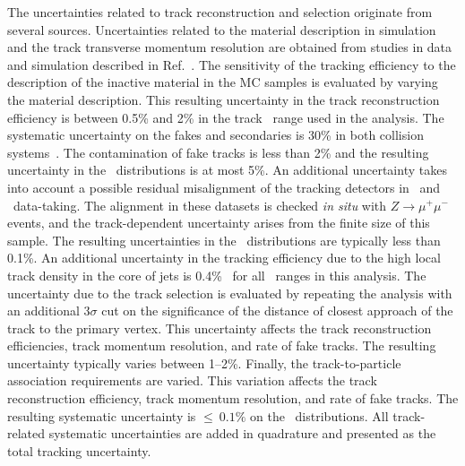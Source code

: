 The uncertainties related to track reconstruction and selection originate from several sources.
Uncertainties related to the material description in simulation and the track transverse 
momentum resolution are obtained from studies in data and simulation described in Ref.~\cite{ATL-PHYS-PUB-2015-051}.
The sensitivity of the tracking efficiency to the description of the 
inactive material in the MC samples is evaluated by varying the material description.
This resulting uncertainty in the track reconstruction efficiency is between
0.5\% and 2\% in the track \pT\ range used in the analysis. 
The systematic uncertainty on the fakes and secondaries is 30\% in both collision systems~\cite{ATL-PHYS-PUB-2015-051}.  The contamination of fake tracks is less than 2\% and the resulting uncertainty in the \Dptr\ distributions is at most 5\%.
An additional uncertainty takes into account a possible residual misalignment of the tracking detectors
in \pp\ and \PbPb\ data-taking. The alignment in these datasets is checked \textit{in situ} with $Z\rightarrow \mu^{+}\mu^{-}$ events, and the track-\pT\-dependent uncertainty arises from the finite size of this sample. The resulting uncertainties in
the \Dptr\ distributions are typically less than 0.1\%. An additional  uncertainty in the tracking efficiency due to the high local track density in the core of jets is 0.4\%~\cite{ATL-PHYS-PUB-2016-007} for all \ptjet\ ranges in this analysis. The uncertainty due to the track selection is evaluated by repeating the analysis with an additional $3\sigma$ cut on the significance of the distance of closest approach of the track to the primary vertex. This uncertainty affects 
the track reconstruction efficiencies, track momentum resolution, and rate of fake tracks. The resulting uncertainty typically varies between 1--2\%.
Finally, the track-to-particle association requirements are varied. This variation affects the track reconstruction efficiency, track momentum resolution, and rate of fake tracks. The resulting systematic uncertainty is $\leq~0.1 \%$ on the \Dptr\ distributions. All track-related systematic uncertainties are added in quadrature and presented as the total tracking uncertainty. 


